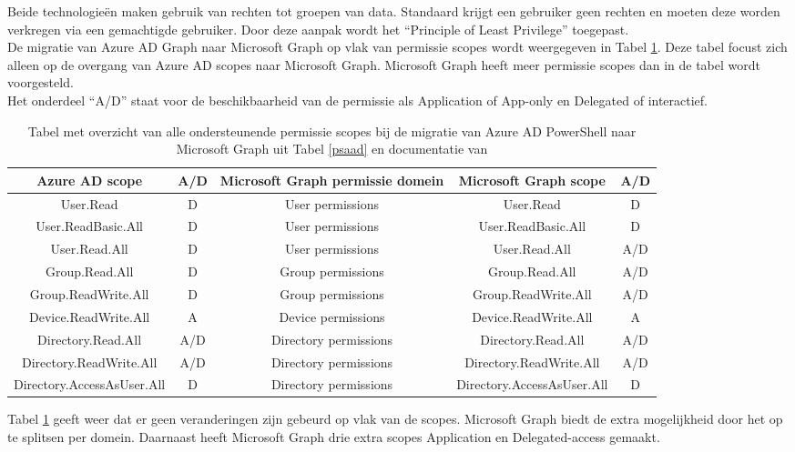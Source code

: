 
Beide technologieën maken gebruik van rechten tot groepen van data. Standaard krijgt een gebruiker geen rechten en moeten deze worden verkregen via een gemachtigde gebruiker. Door deze aanpak wordt het “Principle of Least Privilege” toegepast. \\

De migratie van Azure \ac{AD} Graph naar Microsoft Graph op vlak van permissie scopes wordt weergegeven in Tabel \ref{AADMSGPS}. Deze tabel focust zich alleen op de overgang van Azure \ac{AD} scopes naar Microsoft Graph. Microsoft Graph heeft meer permissie scopes dan in de tabel wordt voorgesteld. \\

Het onderdeel “A/D” staat voor de beschikbaarheid van de permissie als Application of App-only en Delegated of interactief. \\


\begin{table}
    \centering
    \begin{adjustbox}{max width=\textwidth}
    \begin{tabular}{ |c|c||c|c|c| } 
        \hline
        \textbf{Azure AD scope} & \textbf{A/D} & \textbf{Microsoft Graph permissie domein} & \textbf{Microsoft Graph scope} & \textbf{A/D} \\
        \hline
        User.Read & D & User permissions & User.Read & D \\
        User.ReadBasic.All & D & User permissions & User.ReadBasic.All & D \\
        User.Read.All & D & User permissions & User.Read.All & A/D \\
        Group.Read.All & D & Group permissions & Group.Read.All & A/D \\
        Group.ReadWrite.All & D & Group permissions & Group.ReadWrite.All & A/D \\
        Device.ReadWrite.All & A & Device permissions & Device.ReadWrite.All & A \\
        Directory.Read.All & A/D & Directory permissions & Directory.Read.All & A/D \\
        Directory.ReadWrite.All & A/D & Directory permissions & Directory.ReadWrite.All & A/D \\
        Directory.AccessAsUser.All & D & Directory permissions & Directory.AccessAsUser.All & D \\ 
        \hline
    \end{tabular}
    \end{adjustbox}
    \caption[Tabel migratie Azure AD permissie scopes naar Microsoft Graph]{Tabel met overzicht van alle ondersteunende permissie scopes bij de migratie van Azure \ac{AD} PowerShell naar Microsoft Graph uit Tabel \ref{psaad} en documentatie van \textcite{Microsoft2023p}}
    \label{AADMSGPS}
\end{table}

Tabel \ref{AADMSGPS} geeft weer dat er geen veranderingen zijn gebeurd op vlak van de scopes. Microsoft Graph biedt de extra mogelijkheid door het op te splitsen per domein. Daarnaast heeft Microsoft Graph drie extra scopes Application en Delegated-access gemaakt. \\
